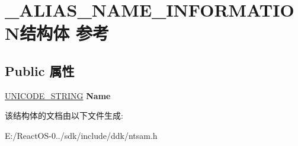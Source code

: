 \hypertarget{struct___a_l_i_a_s___n_a_m_e___i_n_f_o_r_m_a_t_i_o_n}{}\section{\+\_\+\+A\+L\+I\+A\+S\+\_\+\+N\+A\+M\+E\+\_\+\+I\+N\+F\+O\+R\+M\+A\+T\+I\+O\+N结构体 参考}
\label{struct___a_l_i_a_s___n_a_m_e___i_n_f_o_r_m_a_t_i_o_n}
\subsection*{Public 属性}
\begin{DoxyCompactItemize}
\item 
\mbox{\label{struct___a_l_i_a_s___n_a_m_e___i_n_f_o_r_m_a_t_i_o_n_a93f59232ec08209d4370260441721d89}} 
\hyperlink{struct___u_n_i_c_o_d_e___s_t_r_i_n_g}{U\+N\+I\+C\+O\+D\+E\+\_\+\+S\+T\+R\+I\+NG} {\bfseries Name}
\end{DoxyCompactItemize}


该结构体的文档由以下文件生成\+:\begin{DoxyCompactItemize}
\item 
E\+:/\+React\+O\+S-\/0../sdk/include/ddk/ntsam.\+h\end{DoxyCompactItemize}
